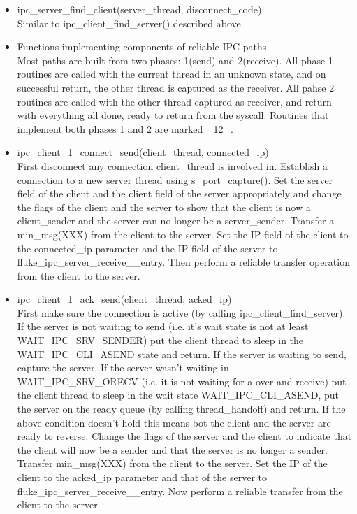 \begin{itemize}
\item ipc_server_find_client(server_thread, disconnect_code)\\ 
Similar to ipc_client_find_server() described above.

\item Functions implementing components of reliable IPC paths\\ 
Most paths are built from two phases: 1(send) and 2(receive).
All phase 1 routines are called with the current thread in an unknown
state, and on successful return, the other thread is captured as the
receiver. All pahse 2 routines are called with the other thread
captured as receiver, and return with everything all done, ready to
return from the syscall. Routines that implement both phases 1 and 2
are marked _12_.

\item ipc_client_1_connect_send(client_thread, connected_ip)\\ 
  First disconnect any connection client_thread is involved
  in. Establish a
  connection to a new server thread using s_port_capture(). Set the
  server field of the client and the client field of the server
  appropriately and change the flags of the client and the server to
  show that the client is now a client_sender and the server can no
  longer be a server_sender. Transfer a min_msg(XXX) from the client
  to the server. Set the IP field of the client to the connected_ip
  parameter and the IP field of the server to
  fluke_ipc_server_receive__entry. Then perform a reliable transfer
  operation from the client to the server.  

\item ipc_client_1_ack_send(client_thread, acked_ip)\\  
  First make sure the connection is active (by calling
  ipc_client_find_server). If the server is not waiting to send
  (i.e. it's wait state is not at least WAIT_IPC_SRV_SENDER) put the
  client thread to sleep in the WAIT_IPC_CLI_ASEND state and return. 
  If the server is waiting to send, capture the server. If the server
  wasn't waiting in WAIT_IPC_SRV_ORECV (i.e. it is not waiting for a
  over and receive) put the client thread to sleep in the wait state
  WAIT_IPC_CLI_ASEND, put the server on the ready queue (by calling
  thread_handoff) and return. If the above condition doesn't hold this
  means bot the client and the server are ready to reverse. Change the
  flags of the server and the client to indicate that the client will
  now be a sender and that the server is no longer a sender. Transfer
  min_msg(XXX) from the client to the server. Set the IP of the client
  to the acked_ip parameter and that of the server to
  fluke_ipc_server_receive__entry. Now perform a reliable transfer
  from the client to the server.
  

\end{itemize}
